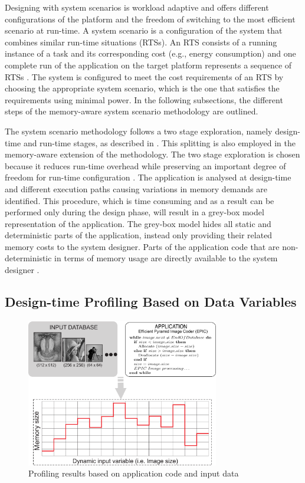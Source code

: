 Designing with system scenarios is workload adaptive and offers different configurations of the platform and the freedom of switching to the most efficient scenario at run-time. 
A system scenario is a configuration of the system that combines similar run-time situations (RTSs). 
An RTS consists of a running instance of a task and its corresponding cost (e.g., energy consumption) and one complete run of the application on the target platform represents a sequence of RTSs \cite{Elena2010}. 
The system is configured to meet the cost requirements of an RTS by choosing the appropriate system scenario, which is the one that satisfies the requirements using minimal power. 
In the following subsections, the different steps of the memory-aware system scenario methodology are outlined. 

The system scenario methodology follows a two stage exploration, namely design-time and run-time stages, as described in \cite{Gheorghita2007}. 
This splitting is also employed in the memory-aware extension of the methodology. 
The two stage exploration is chosen because it reduces run-time overhead while preserving an important degree of freedom for run-time configuration \cite{tcm}. 
The application is analysed at design-time and different execution paths causing variations in memory demands are identified. 
This procedure, which is time consuming and as a result can be performed only during the design phase, will result in a grey-box model representation of the application. 
The grey-box model hides all static and deterministic parts of the application, instead only providing their related memory costs to the system designer.
Parts of the application code that are non-deterministic in terms of memory usage are directly available to the system designer \cite{graybox}. 


\subsection{Design-time Profiling Based on Data Variables}

\begin{figure}
\centering
\includegraphics[width=0.75\textwidth]{C/profiling2.pdf}
\caption{Profiling results based on application code and input data}
\label{fig:profilingC}
\end{figure}

